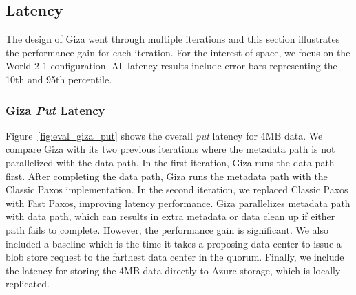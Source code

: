 

\subsection{\name Latency}

The design of Giza went through multiple iterations and this section illustrates
the performance gain for each iteration. For the interest of space, we focus on
the World-2-1 configuration. All latency results include error bars representing
the 10th and 95th percentile.

\subsubsection{Giza {\em Put} Latency}

Figure~\ref{fig:eval_giza_put} shows the \name overall {\em put} latency for 4MB
data. We compare Giza with its two previous iterations where the metadata path
is not parallelized with the data path. In the first iteration, Giza runs the
data path first. After completing the data path, Giza runs the metadata path
with the Classic Paxos implementation. In the second iteration, we replaced
Classic Paxos with Fast Paxos, improving latency performance. Giza parallelizes
metadata path with data path, which can results in extra metadata or data clean
up if either path fails to complete. However, the performance gain is
significant. We also included a baseline which is the time it takes a proposing
data center to issue a blob store request to the farthest data center in the
quorum. Finally, we include the latency for storing the 4MB data directly to
Azure storage, which is locally replicated.

